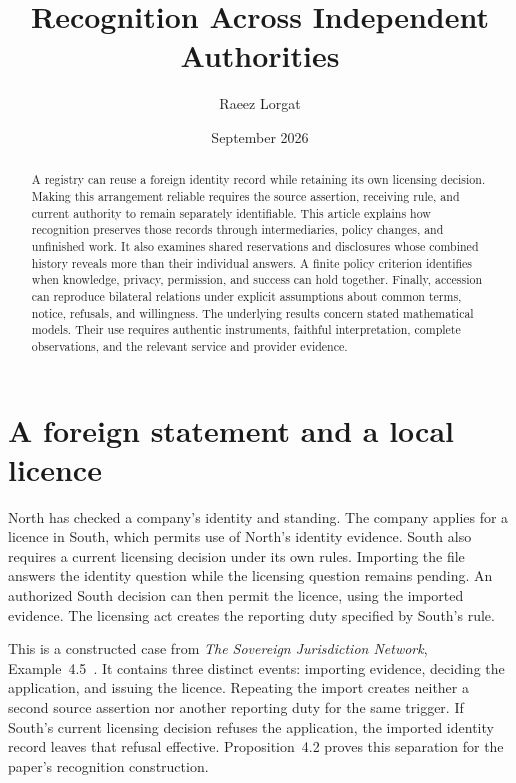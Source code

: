 \documentclass{momentum}
\title{Recognition Across Independent Authorities}
\author{Raeez Lorgat}
\date{September 2026}
\begin{document}
\maketitle

\begin{abstract}
A registry can reuse a foreign identity record while retaining its own licensing decision.
Making this arrangement reliable requires the source assertion, receiving rule, and current authority to remain separately identifiable.
This article explains how recognition preserves those records through intermediaries, policy changes, and unfinished work.
It also examines shared reservations and disclosures whose combined history reveals more than their individual answers.
A finite policy criterion identifies when knowledge, privacy, permission, and success can hold together.
Finally, accession can reproduce bilateral relations under explicit assumptions about common terms, notice, refusals, and willingness.
The underlying results concern stated mathematical models.
Their use requires authentic instruments, faithful interpretation, complete observations, and the relevant service and provider evidence.
\end{abstract}

\section{A foreign statement and a local licence}
\label{sec:registry}

North has checked a company's identity and standing.
The company applies for a licence in South, which permits use of North's identity evidence.
South also requires a current licensing decision under its own rules.
Importing the file answers the identity question while the licensing question remains pending.
An authorized South decision can then permit the licence, using the imported evidence.
The licensing act creates the reporting duty specified by South's rule.

This is a constructed case from \emph{The Sovereign Jurisdiction Network}, Example~4.5~\cite{sjn}.
It contains three distinct events: importing evidence, deciding the application, and issuing the licence.
Repeating the import creates neither a second source assertion nor another reporting duty for the same trigger.
If South's current licensing decision refuses the application, the imported identity record leaves that refusal effective.
Proposition~4.2 proves this separation for the paper's recognition construction.
\end{document}
